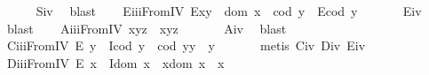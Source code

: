 \begin{isabellebody}
%
\isadelimproof
\ \ \ \ %
\endisadelimproof
%
\isatagproof
{}\isamarkupfalse%
\ S\isactrlsub i\isactrlsub v\ \isamarkupfalse%
\ blast%
\endisatagproof
{\isafoldproof}%
%
\isadelimproof
\isanewline
%
\endisadelimproof
\ \ \isamarkupfalse%
\ E\isactrlsub i\isactrlsub i\isactrlsub iFromIV{\isacharcolon}\ {\isachardoublequoteopen}E{\isacharparenleft}x{\isasymcdot}y{\isacharparenright}\ \isactrlbold {\isasymleftarrow}\ {\isacharparenleft}dom\ x\ {\isasymcong}\ cod\ y\ \isactrlbold {\isasymand}\ {\isacharparenleft}E{\isacharparenleft}cod\ y{\isacharparenright}{\isacharparenright}{\isacharparenright}{\isachardoublequoteclose}\ \isanewline
%
\isadelimproof
\ \ \ \ %
\endisadelimproof
%
\isatagproof
{}\isamarkupfalse%
\ E\isactrlsub i\isactrlsub v\ \isamarkupfalse%
\ blast%
\endisatagproof
{\isafoldproof}%
%
\isadelimproof
\isanewline
%
\endisadelimproof
\ \ \isamarkupfalse%
\ A\isactrlsub i\isactrlsub i\isactrlsub iFromIV{\isacharcolon}\ {\isachardoublequoteopen}x{\isasymcdot}{\isacharparenleft}y{\isasymcdot}z{\isacharparenright}\ {\isasymcong}\ {\isacharparenleft}x{\isasymcdot}y{\isacharparenright}{\isasymcdot}z{\isachardoublequoteclose}\ \isanewline
%
\isadelimproof
\ \ \ \ %
\endisadelimproof
%
\isatagproof
{}\isamarkupfalse%
\ A\isactrlsub i\isactrlsub v\ \isamarkupfalse%
\ blast%
\endisatagproof
{\isafoldproof}%
%
\isadelimproof
\isanewline
%
\endisadelimproof
\ \ \isamarkupfalse%
\ C\isactrlsub i\isactrlsub i\isactrlsub iFromIV{\isacharcolon}\ {\isachardoublequoteopen}E\ y\ \isactrlbold {\isasymrightarrow}\ {\isacharparenleft}I{\isacharparenleft}cod\ y{\isacharparenright}\ \isactrlbold {\isasymand}\ {\isacharparenleft}cod\ y{\isacharparenright}{\isasymcdot}y\ {\isasymcong}\ y{\isacharparenright}{\isachardoublequoteclose}\ \isanewline
%
\isadelimproof
\ \ \ \ %
\endisadelimproof
%
\isatagproof
{}\isamarkupfalse%
\ {\isacharparenleft}metis\ C\isactrlsub i\isactrlsub v\ D\isactrlsub i\isactrlsub v\ E\isactrlsub i\isactrlsub v{\isacharparenright}%
\endisatagproof
{\isafoldproof}%
%
\isadelimproof
\isanewline
%
\endisadelimproof
\ \ \isamarkupfalse%
\ D\isactrlsub i\isactrlsub i\isactrlsub iFromIV{\isacharcolon}\ {\isachardoublequoteopen}E\ x\ \isactrlbold {\isasymrightarrow}\ {\isacharparenleft}I{\isacharparenleft}dom\ x{\isacharparenright}\ \isactrlbold {\isasymand}\ x{\isasymcdot}{\isacharparenleft}dom\ x{\isacharparenright}\ {\isasymcong}\ x{\isacharparenright}{\isachardoublequoteclose}\isanewline

\end{isabellebody}
